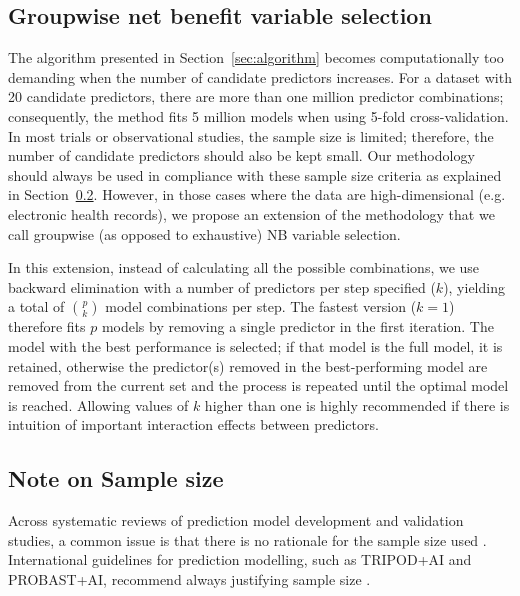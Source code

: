 \subsection{Groupwise net benefit variable selection}

The algorithm presented in Section~\ref{sec:algorithm} becomes computationally too demanding when the number of candidate predictors increases. For a dataset with 20 candidate predictors, there are more than one million predictor combinations; consequently, the method fits 5 million models when using 5-fold cross-validation. In most trials or observational studies, the sample size is limited; therefore, the number of candidate predictors should also be kept small. Our methodology should always be used in compliance with these sample size criteria as explained in Section~\ref{sec:sample_size}. However, in those cases where the data are high-dimensional (e.g. electronic health records), we propose an extension of the methodology that we call groupwise (as opposed to exhaustive) \gls{NB} variable selection.


In this extension, instead of calculating all the possible combinations, we use backward elimination with a number of predictors per step specified ($k$), yielding a total of $\binom{p}{k}$ model combinations per step. The fastest version ($k = 1$) therefore fits $p$ models by removing a single predictor in the first iteration. The model with the best performance is selected; if that model is the full model, it is retained, otherwise the predictor(s) removed in the best-performing model are removed from the current set and the process is repeated until the optimal model is reached. Allowing values of $k$ higher than one is highly recommended if there is intuition of important interaction effects between predictors.

\subsection{Note on Sample size}
\label{sec:sample_size}
Across systematic reviews of prediction model development and validation studies, a common issue is that there is no rationale for the sample size used \cite{barrenadaADNEXRiskPrediction2024,wynantsPredictionModelsDiagnosis2020}. International guidelines for prediction modelling, such as TRIPOD+AI and PROBAST+AI, recommend always justifying sample size \cite{collinsTRIPODAIStatementUpdated2024,moonsPROBASTAIUpdatedQuality2025}.

